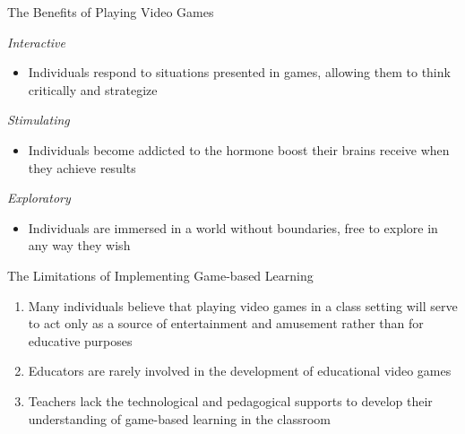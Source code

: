 \documentclass{beamer}
\begin{document}
	\begin{frame}{The Benefits of Playing Video Games}
		
		\begin{block}{\textit{Interactive}}
			 \begin{itemize}
			 \item Individuals respond to situations presented in games, allowing them to think critically and strategize
			 \end{itemize}
		\end{block} \pause
	
		\begin{block}{\textit{Stimulating}}
			\begin{itemize}
				\item Individuals become addicted to the hormone boost their brains receive when they achieve results
			\end{itemize}
		\end{block} \pause
	
		\begin{block}{\textit{Exploratory}}
			\begin{itemize}
				\item Individuals are immersed in a world without boundaries, free to explore in any way they wish
			\end{itemize}
		\end{block}
	
	
	\end{frame}

	\begin{frame}{The Limitations of Implementing Game-based Learning}
		\begin{enumerate}
			\item Many individuals believe that playing video games in a class setting will serve to act only as a source of entertainment and amusement rather than for educative purposes \newline 
			\item Educators are rarely involved in the development of educational video games \newline
			\item Teachers lack the technological and pedagogical supports to develop their understanding of game-based learning in the classroom 
			
		\end{enumerate}
	
		
	\end{frame}
\end{document}
